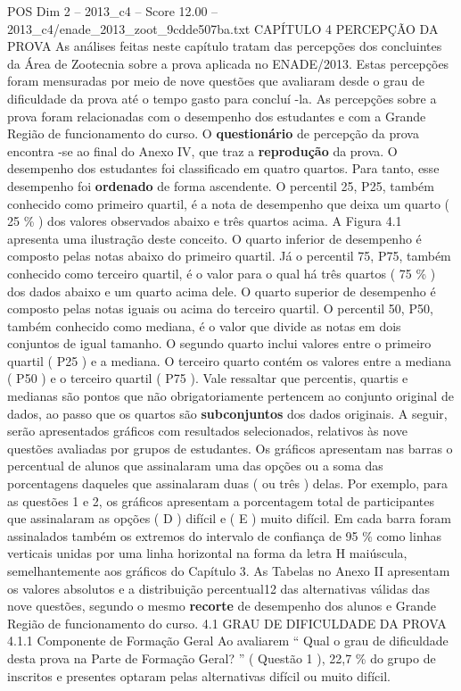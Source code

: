 \begin{textsample}{POS Dim 2 – 2013\_c4 – Score 12.00 – 2013\_c4/enade\_2013\_zoot\_9cdde507ba.txt}  \label{ex:f2_pos_070}
CAPÍTULO 4 PERCEPÇÃO DA PROVA As análises feitas neste capítulo tratam das percepções dos concluintes da Área de Zootecnia sobre a prova aplicada no ENADE/2013.
Estas percepções foram mensuradas por meio de nove questões que avaliaram desde o grau de dificuldade da prova até o tempo gasto para concluí -la.
As percepções sobre a prova foram relacionadas com o desempenho dos estudantes e com a Grande Região de funcionamento do curso.
O \textbf{questionário} de percepção da prova encontra -se ao final do Anexo IV, que traz a \textbf{reprodução} da prova.
O desempenho dos estudantes foi classificado em quatro quartos.
Para tanto, esse desempenho foi \textbf{ordenado} de forma ascendente.
O percentil 25, P25, também conhecido como primeiro quartil, é a nota de desempenho que deixa um quarto ( 25 \% ) dos valores observados abaixo e três quartos acima.
A Figura 4.1 apresenta uma ilustração deste conceito.
O quarto inferior de desempenho é composto pelas notas abaixo do primeiro quartil.
Já o percentil 75, P75, também conhecido como terceiro quartil, é o valor para o qual há três quartos ( 75 \% ) dos dados abaixo e um quarto acima dele.
O quarto superior de desempenho é composto pelas notas iguais ou acima do terceiro quartil.
O percentil 50, P50, também conhecido como mediana, é o valor que divide as notas em dois conjuntos de igual tamanho.
O segundo quarto inclui valores entre o primeiro quartil ( P25 ) e a mediana.
O terceiro quarto contém os valores entre a mediana ( P50 ) e o terceiro quartil ( P75 ).
Vale ressaltar que percentis, quartis e medianas são pontos que não obrigatoriamente pertencem ao conjunto original de dados, ao passo que os quartos são \textbf{subconjuntos} dos dados originais.
A seguir, serão apresentados gráficos com resultados selecionados, relativos às nove questões avaliadas por grupos de estudantes.
Os gráficos apresentam nas barras o percentual de alunos que assinalaram uma das opções ou a soma das porcentagens daqueles que assinalaram duas ( ou três ) delas.
Por exemplo, para as questões 1 e 2, os gráficos apresentam a porcentagem total de participantes que assinalaram as opções ( D ) difícil e ( E ) muito difícil.
Em cada barra foram assinalados também os extremos do intervalo de confiança de 95 \% como linhas verticais unidas por uma linha horizontal na forma da letra H maiúscula, semelhantemente aos gráficos do Capítulo 3.
As Tabelas no Anexo II apresentam os valores absolutos e a distribuição percentual12 das alternativas válidas das nove questões, segundo o mesmo \textbf{recorte} de desempenho dos alunos e Grande Região de funcionamento do curso. 4.1 GRAU DE DIFICULDADE DA PROVA 4.1.1 Componente de Formação Geral Ao avaliarem “ Qual o grau de dificuldade desta prova na Parte de Formação Geral? ” ( Questão 1 ), 22,7 \% do grupo de inscritos e presentes optaram pelas alternativas difícil ou muito difícil.

\end{textsample}
